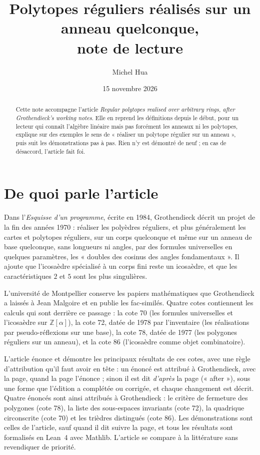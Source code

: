 \documentclass[11pt,a4paper]{amsart}
\title[Note de lecture : polytopes réguliers sur un anneau]{Polytopes réguliers réalisés sur un anneau quelconque,\\ note de lecture}
\author{Michel Hua}
\date{15 novembre 2026}
\theoremstyle{definition}
\theoremstyle{plain}
\theoremstyle{remark}
\newcommand{\Z}{\mathbb Z}
\begin{document}
\maketitle

\begin{abstract}
Cette note accompagne l'article \emph{Regular polytopes realised over arbitrary rings, after Grothendieck's working notes}. Elle en reprend les définitions depuis le début, pour un lecteur qui connaît l'algèbre linéaire mais pas forcément les anneaux ni les polytopes, explique sur des exemples le sens de « réaliser un polytope régulier sur un anneau », puis suit les démonstrations pas à pas. Rien n'y est démontré de neuf ; en cas de désaccord, l'article fait foi.
\end{abstract}

\section{De quoi parle l'article}

Dans l'\emph{Esquisse d'un programme}, écrite en 1984, Grothendieck décrit un projet de la fin des années 1970 : réaliser les polyèdres réguliers, et plus généralement les cartes et polytopes réguliers, sur un corps quelconque et même sur un anneau de base quelconque, sans longueurs ni angles, par des formules universelles en quelques paramètres, les « doubles des cosinus des angles fondamentaux ». Il ajoute que l'icosaèdre spécialisé à un corps fini reste un icosaèdre, et que les caractéristiques $2$ et $5$ sont les plus singulières.

L'université de Montpellier conserve les papiers mathématiques que Grothendieck a laissés à Jean Malgoire et en publie les fac-similés. Quatre cotes contiennent les calculs qui sont derrière ce passage : la cote 70 (les formules universelles et l'icosaèdre sur $\Z[\alpha]$), la cote 72, datée de 1978 par l'inventaire (les réalisations par pseudo-réflexions sur une base), la cote 78, datée de 1977 (les polygones réguliers sur un anneau), et la cote 86 (l'icosaèdre comme objet combinatoire).

L'article énonce et démontre les principaux résultats de ces cotes, avec une règle d'attribution qu'il faut avoir en tête : un énoncé est attribué à Grothendieck, avec la page, quand la page l'énonce ; sinon il est dit \emph{d'après} la page (« after »), sous une forme que l'édition a complétée ou corrigée, et chaque changement est décrit. Quatre énoncés sont ainsi attribués à Grothendieck : le critère de fermeture des polygones (cote 78), la liste des sous-espaces invariants (cote 72), la quadrique circonscrite (cote 70) et les trièdres distingués (cote 86). Les démonstrations sont celles de l'article, sauf quand il dit suivre la page, et tous les résultats sont formalisés en Lean~4 avec Mathlib. L'article se compare à la littérature sans revendiquer de priorité.
\end{document}
